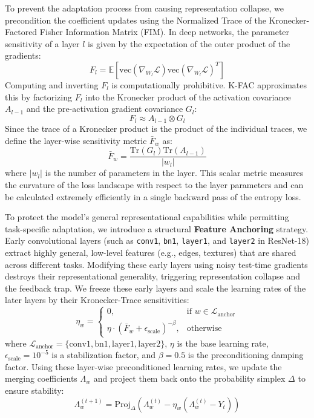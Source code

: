 \documentclass{article}
\theoremstyle{plain}
\theoremstyle{definition}
\theoremstyle{remark}
\begin{document}
To prevent the adaptation process from causing representation collapse, we precondition the coefficient updates using the Normalized Trace of the Kronecker-Factored Fisher Information Matrix (FIM). In deep networks, the parameter sensitivity of a layer $l$ is given by the expectation of the outer product of the gradients:
\begin{equation}
F_l = \mathbb{E} \left[ \text{vec}(\nabla_{W_l} \mathcal{L}) \text{vec}(\nabla_{W_l} \mathcal{L})^T \right]
\end{equation}
Computing and inverting $F_l$ is computationally prohibitive. K-FAC approximates this by factorizing $F_l$ into the Kronecker product of the activation covariance $A_{l-1}$ and the pre-activation gradient covariance $G_l$:
\begin{equation}
F_l \approx A_{l-1} \otimes G_l
\end{equation}
Since the trace of a Kronecker product is the product of the individual traces, we define the layer-wise sensitivity metric $\bar{F}_w$ as:
\begin{equation}
\bar{F}_w = \frac{\text{Tr}(G_l) \text{Tr}(A_{l-1})}{|w_l|}
\end{equation}
where $|w_l|$ is the number of parameters in the layer. This scalar metric measures the curvature of the loss landscape with respect to the layer parameters and can be calculated extremely efficiently in a single backward pass of the entropy loss.

To protect the model's general representational capabilities while permitting task-specific adaptation, we introduce a structural \textbf{Feature Anchoring} strategy. Early convolutional layers (such as \texttt{conv1}, \texttt{bn1}, \texttt{layer1}, and \texttt{layer2} in ResNet-18) extract highly general, low-level features (e.g., edges, textures) that are shared across different tasks. Modifying these early layers using noisy test-time gradients destroys their representational generality, triggering representation collapse and the feedback trap. We freeze these early layers and scale the learning rates of the later layers by their Kronecker-Trace sensitivities:
\begin{equation}
\eta_w = 
\begin{cases}
0, & \text{if } w \in \mathcal{L}_{\text{anchor}} \\
\eta \cdot (\bar{F}_w + \epsilon_{\text{scale}})^{-\beta}, & \text{otherwise}
\end{cases}
\end{equation}
where $\mathcal{L}_{\text{anchor}} = \{\text{conv1}, \text{bn1}, \text{layer1}, \text{layer2}\}$, $\eta$ is the base learning rate, $\epsilon_{\text{scale}} = 10^{-5}$ is a stabilization factor, and $\beta = 0.5$ is the preconditioning damping factor.
Using these layer-wise preconditioned learning rates, we update the merging coefficients $\Lambda_w$ and project them back onto the probability simplex $\Delta$ to ensure stability:
\begin{equation}
\Lambda^{(t+1)}_w = \text{Proj}_{\Delta} \left( \Lambda^{(t)}_w - \eta_w (\Lambda^{(t)}_w - Y_t) \right)
\end{equation}
\end{document}
